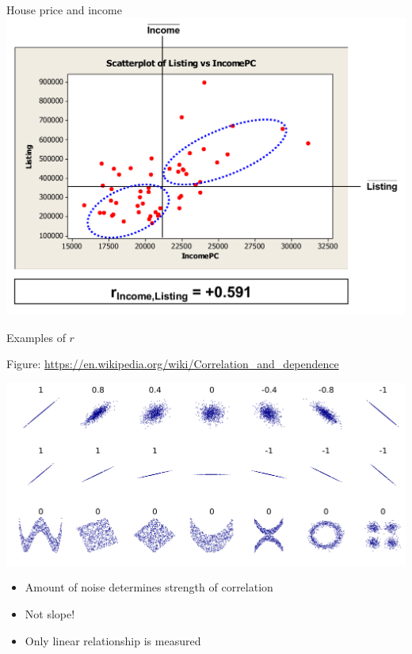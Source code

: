 \documentclass[aspectratio=169,usenames,dvipsnames]{beamer}
\begin{document}
\begin{frame}{House price and income}
\includegraphics[height=0.8\textheight]{fig/incomelistingcorr}
\end{frame}

\begin{frame}{Examples of $r$}
\begin{reference}\vspace{1em}
Figure: \url{https://en.wikipedia.org/wiki/Correlation_and_dependence}
\end{reference}
\includegraphics[height=0.6\textheight]{fig/wpcorrelation}

\begin{itemize}
    \item Amount of noise determines strength of correlation
    \item Not slope!
    \item Only linear relationship is measured
\end{itemize}
\end{frame}
\end{document}
